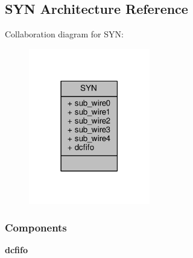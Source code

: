 \subsection{S\+YN Architecture Reference}
\label{classsmplnr__sync__fifo_1_1SYN}


Collaboration diagram for S\+YN\+:\nopagebreak
\begin{figure}[H]
\begin{center}
\leavevmode
\includegraphics[width=150pt]{d6/d24/classsmplnr__sync__fifo_1_1SYN__coll__graph}
\end{center}
\end{figure}
\subsubsection*{Components}
 \begin{DoxyCompactItemize}
\item 
{\bf dcfifo}  {\bfseries }  
\end{DoxyCompactItemize}
